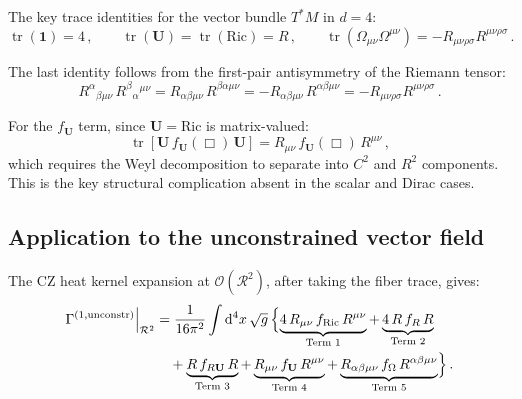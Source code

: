 \documentclass[11pt,a4paper]{article}
\newcommand{\Id}{\mathbf{1}}
\newcommand{\tr}{\operatorname{tr}}
\newcommand{\Rsq}{R_{\mu\nu\rho\sigma}R^{\mu\nu\rho\sigma}}
\newcommand{\dd}{\mathrm{d}}
\theoremstyle{definition}
\theoremstyle{remark}
\begin{document}
The key trace identities for the vector bundle $T^*M$ in $d=4$:
\begin{equation}
  \boxed{
  \tr(\Id) = 4\,,\qquad
  \tr(\mathbf{U}) = \tr(\mathrm{Ric}) = R\,,\qquad
  \tr(\Omega_{\mu\nu}\Omega^{\mu\nu}) = -\Rsq\,.
  }
  \label{eq:traces}
\end{equation}

The last identity follows from the first-pair antisymmetry of the
Riemann tensor:
\begin{equation*}
  R^\alpha{}_{\beta\mu\nu}\,R^\beta{}_\alpha{}^{\mu\nu}
  = R_{\alpha\beta\mu\nu}\,R^{\beta\alpha\mu\nu}
  = -R_{\alpha\beta\mu\nu}\,R^{\alpha\beta\mu\nu}
  = -\Rsq\,.
\end{equation*}

For the $f_{\mathbf{U}}$ term, since $\mathbf{U} = \mathrm{Ric}$ is
matrix-valued:
\begin{equation}
  \tr[\mathbf{U}\,f_{\mathbf{U}}(\Box)\,\mathbf{U}]
  = R_{\mu\nu}\,f_{\mathbf{U}}(\Box)\,R^{\mu\nu}\,,
  \label{eq:tr-UfU}
\end{equation}
which requires the Weyl decomposition to separate into $C^2$ and $R^2$
components.  This is the key structural complication absent in the
scalar and Dirac cases.


\subsection{Application to the unconstrained vector field}

The CZ heat kernel expansion at $\mathcal{O}(\mathcal{R}^2)$, after
taking the fiber trace, gives:
\begin{align}
  \Gamma^{(1,\mathrm{unconstr})}\Big|_{\mathcal{R}^2}
  &= \frac{1}{16\pi^2}\int \dd^4 x\,\sqrt{g}\,\Bigl\{
  \underbrace{4\,R_{\mu\nu}\,f_{\mathrm{Ric}}\,R^{\mu\nu}}_{\text{Term 1}}
  + \underbrace{4\,R\,f_R\,R}_{\text{Term 2}}
  \nonumber\\
  &\quad
  + \underbrace{R\,f_{R\mathbf{U}}\,R}_{\text{Term 3}}
  + \underbrace{R_{\mu\nu}\,f_{\mathbf{U}}\,R^{\mu\nu}}_{\text{Term 4}}
  + \underbrace{R_{\alpha\beta\mu\nu}\,f_\Omega\,
    R^{\alpha\beta\mu\nu}}_{\text{Term 5}}
  \Bigr\}\,.
  \label{eq:vector-5terms}
\end{align}
\end{document}
